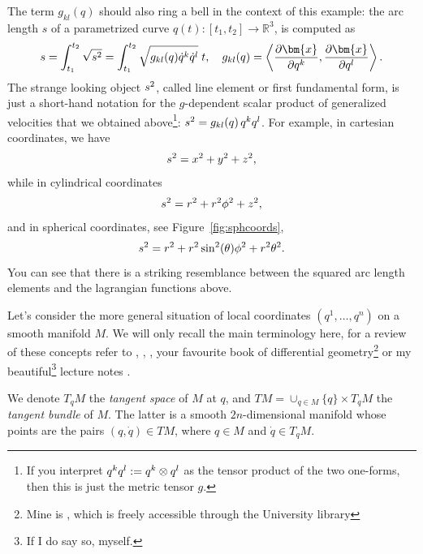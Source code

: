 \documentclass[english,fontsize=11pt,paper=a5,oneside]{scrbook}
\newcommand{\R}{\mathbb{R}}
\newcommand{\bx}{\bm{x}}
\newcommand{\lag}{\langle}
\newcommand{\rag}{\rangle}
\let\d\relax
\newcommand{\d}{\mathrm{d}}
\theoremstyle{definition}
\begin{document}
The term $g_{kl} (q)$ should also ring a bell in the context of this example: the arc length $s$ of a parametrized curve $q(t) : [t_1,t_2] \to \R^3$, is computed as
\begin{equation}\label{eq:arclen}
  \begin{aligned}
    s = \int_{t_1}^{t_2} \sqrt{\d s^2} = \int_{t_1}^{t_2} \sqrt{g_{kl}(q)\dot q^k \dot q^l} \;\d t,\quad
    g_{kl} (q) = \left\lag\frac{\partial\bx}{\partial q^k}, \frac{\partial \bx}{\partial q^l}\right\rag.
  \end{aligned}
\end{equation}
The strange looking object $\d s^2$, called line element or first fundamental form, is just a short-hand notation for the $g$-dependent scalar product of generalized velocities that we obtained above\footnote{If you interpret $\d q^k \d q^l := \d q^k \otimes \d q^l$ as the tensor product of the two one-forms, then this is just the metric tensor $g$.}: $\d s^2 = g_{kl}(q)\, \d q^k \d q^l$.
For example, in cartesian coordinates, we have
\begin{equation}
  \d s^2 = \d x^2 + \d y^2 + \d z^2,
\end{equation}
while in cylindrical coordinates
\begin{equation}
  \d s^2 = \d r^2 + r^2 \d \phi^2 + \d z^2,
\end{equation}
and in spherical coordinates, see Figure~\ref{fig:sphcoords},
\begin{equation}\label{eq:spharc}
  \d s^2 = \d r^2 + r^2 \sin^2(\theta) \d \phi^2 + r^2 \d \theta^2.
\end{equation}
You can see that there is a striking resemblance between the squared arc length elements and the lagrangian functions above. \medskip

Let's consider the more general situation of local coordinates $(q^1, \ldots, q^n)$ on a smooth manifold $M$.
We will only recall the main terminology here, for a review of these concepts refer to \cite[Chapter 4.18]{book:arnold}, \cite[Appendix A]{book:knauf}, \cite[Chapter 4]{book:marsdenratiu}, your favourite book of differential geometry\footnote{Mine is \cite{book:lee}, which is freely accessible through the University library} or my beautiful\footnote{If I do say so, myself.} lecture notes \cite{lectures:aom:seri}.

We denote $T_q M$ the \emph{tangent space} of $M$ at $q$, and $TM = \cup_{q\in M}\{q\}\times T_q M$ the \emph{tangent bundle} of $M$. The latter is a smooth $2n$-dimensional manifold whose points are the pairs $(q,\dot q)\in TM$, where $q\in M$ and $\dot q\in T_q M$.
\end{document}

